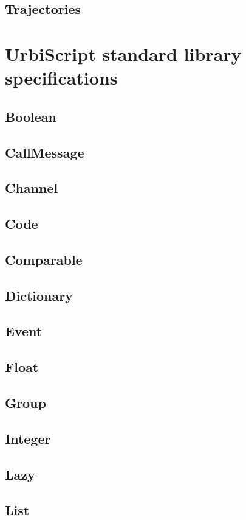 \documentclass[openright,twoside,12pt]{report}
\newcommand{\us}{UrbiScript\xspace}
\begin{document}
\section{Trajectories}

\chapter{\us standard library specifications}
\label{chap:std}

\section{Boolean}
\section{CallMessage}
\label{sect:std-callmsg}
\section{Channel}
\section{Code}
\section{Comparable}
\section{Dictionary}
\section{Event}
\section{Float}
\section{Group}
\section{Integer}
\section{Lazy}
\section{List}
\end{document}
